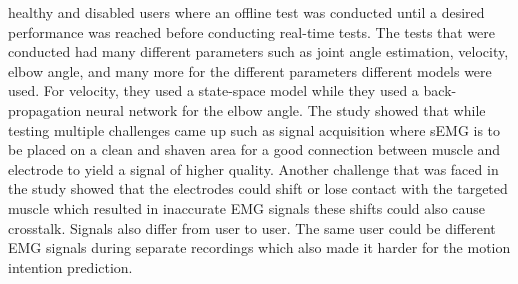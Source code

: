 healthy and disabled users where an offline test was conducted until a desired performance was reached before conducting
real-time tests. The tests that were conducted had many different parameters such as joint angle estimation, velocity, elbow angle, and many more for the different parameters different models were used. 
For velocity, they used a state-space model while they used a back-propagation neural network for the elbow angle. The study showed that while testing multiple challenges came up such as signal acquisition where sEMG
is to be placed on a clean and shaven area for a good connection between muscle and electrode to yield a signal of higher quality. Another challenge that was faced in the study showed that the electrodes could shift or lose contact 
with the targeted muscle which resulted in inaccurate EMG signals these shifts could also cause crosstalk. Signals also differ from user to user. The same user could be different EMG signals during separate recordings which also made it 
harder for the motion intention prediction.